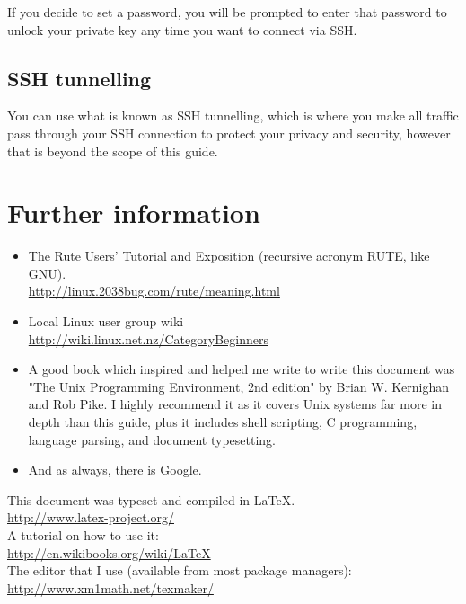 \documentclass{article}
\begin{document}
If you decide to set a password, you will be prompted to enter that password to unlock your private key any time you want to connect via SSH.

\subsection{SSH tunnelling}
You can use what is known as SSH tunnelling, which is where you make all traffic pass through your SSH connection to protect your privacy and security, however that is beyond the scope of this guide. 

\section{Further information}
\begin{itemize}
\item The Rute Users' Tutorial and Exposition (recursive acronym RUTE, like GNU). \\ 
\url{http://linux.2038bug.com/rute/meaning.html}

\item Local Linux user group wiki \\ \url{http://wiki.linux.net.nz/CategoryBeginners}

\item A good book which inspired and helped me write to write this document was "The Unix Programming Environment, 2nd edition" by Brian W. Kernighan and Rob Pike. I highly recommend it as it covers Unix systems far more in depth than this guide, plus it includes shell scripting, C programming, language parsing, and document typesetting. 

\item And as always, there is Google.
\end{itemize} 
\begin{center}
This document was typeset and compiled in \LaTeX.\\
\url{http://www.latex-project.org/} \\
A tutorial on how to use it: \\
\url{http://en.wikibooks.org/wiki/LaTeX} \\
The editor that I use (available from most package managers): \\
\url{http://www.xm1math.net/texmaker/} \\
\end{center}
\end{document}

